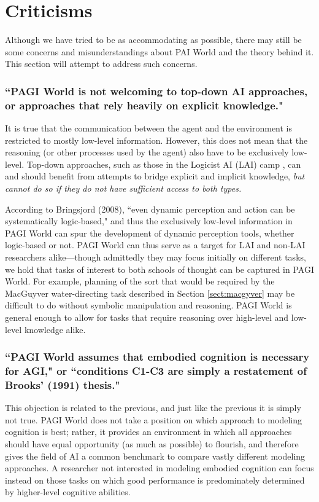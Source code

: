 \section{Criticisms}
\label{sect:criticisms}

Although we have tried to be as accommodating as possible, there may still be some concerns and misunderstandings about PAI World and the theory behind it. This section will attempt to address such concerns.

\subsubsection{``PAGI World is not welcoming to top-down AI approaches, or approaches that rely heavily on explicit knowledge."}

It is true that the communication between the agent and the environment is restricted to mostly low-level information. However, this does not mean that the reasoning (or other processes used by the agent) also have to be exclusively low-level. Top-down approaches, such as those in the Logicist AI (LAI) camp \cite{Bringsjord2008c}, can and should benefit from attempts to bridge explicit and implicit knowledge, \textit{but cannot do so if they do not have sufficient access to both types.} 

According to Bringsjord (2008), ``even dynamic perception and action can be systematically logic-based," and thus the exclusively low-level information in PAGI World can spur the development of dynamic perception tools, whether logic-based or not. PAGI World can thus serve as a target for LAI and non-LAI researchers alike---though admittedly they may focus initially on different tasks, we hold that tasks of interest to both schools of thought can be captured in PAGI World. For example, planning of the sort that would be required by the MacGuyver water-directing task described in Section \ref{sect:macgyver} may be difficult to do without symbolic manipulation and reasoning. PAGI World is general enough to allow for tasks that require reasoning over high-level and low-level knowledge alike.

\subsubsection{``PAGI World assumes that embodied cognition is necessary for AGI," or ``conditions \textbf{C1-C3} are simply a restatement of Brooks' (1991) thesis."}

This objection is related to the previous, and just like the previous it is simply not true. PAGI World does not take a position on which approach to modeling cognition is best; rather, it provides an environment in which all approaches should have equal opportunity (as much as possible) to flourish, and therefore gives the field of AI a common benchmark to compare vastly different modeling approaches. A researcher not interested in modeling embodied cognition can focus instead on those tasks on which good performance is predominately determined by higher-level cognitive abilities. 

